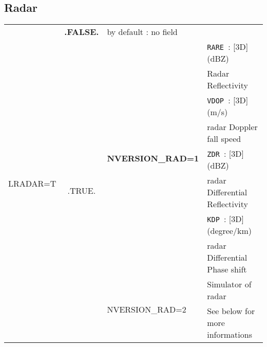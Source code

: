\subsection{Radar}
\begin{center}
\begin{makeimage}
\begin{tabular}{|p{2.5cm}|c|l|p{6cm}|}
\hline
\multirow{11}{*}{LRADAR=T}\index{LRADAR!\innam{NAM\_DIAG}}&\textbf{.FALSE.} &\multicolumn{2}{|l|}{ by default : no field} \\\cline{2-4}
&\multirow{10}{*}{.TRUE.} &\multirow{8}{*}{ \textbf{NVERSION\_RAD=1}}\index{NVERSION\_RAD!\innam{NAM\_DIAG}}&{\tt RARE }: [3D] (dBZ)\\
&&& Radar Reflectivity \\\cline{4-4}
& &&{\tt VDOP }: [3D] (m/s)\\
&&&radar Doppler fall speed\\\cline{4-4}
& &&{\tt ZDR  }: [3D]  (dBZ)\\
&&&radar Differential Reflectivity\\\cline{4-4}
& &&{\tt KDP  }: [3D] (degree/km)\\
&&& radar Differential Phase shift \\\cline{3-4}
& &\multirow{2}{*}{NVERSION\_RAD=2}&Simulator of radar \\
& &&See below for more informations\\\hline
\end{tabular} 
\end{makeimage}
\end{center}
